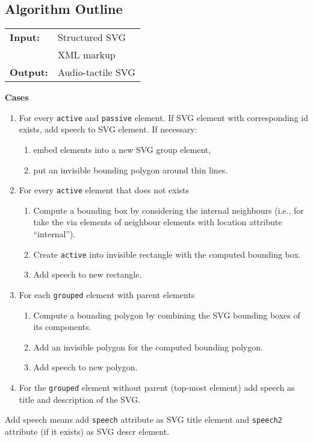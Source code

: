 \documentclass{article}
\def\atom{\texttt{active}\xspace}
\def\passive{\texttt{passive}\xspace}
\def\grouped{\texttt{grouped}\xspace}
\begin{document}
\subsection*{Algorithm Outline}

\begin{tabular}{ll}
  \textbf{Input:} & Structured SVG \\
  & XML markup \\
  \textbf{Output:} & Audio-tactile SVG
\end{tabular}

\textbf{Cases}

\begin{enumerate}
\item For every \atom and \passive element. If SVG element with corresponding id
  exists, add speech to SVG element. If necessary:
  \begin{enumerate}
  \item embed elements into a new SVG group element,
  \item put an invisible bounding polygon around thin lines.
  \end{enumerate}
\item For every \atom element that does not exists
  \begin{enumerate}
  \item Compute a bounding box by considering the internal neighbours (i.e., for
    take the via elements of neighbour elements with location attribute
    ``internal'').
  \item Create \atom into invisible rectangle with the computed bounding box.
  \item Add speech to new rectangle.
  \end{enumerate}
\item For each \grouped element with parent elements
  \begin{enumerate}
  \item Compute a bounding polygon by combining the SVG bounding boxes of its components.
  \item Add an invisible polygon for the computed bounding polygon.
  \item Add speech to new polygon.
  \end{enumerate}
\item For the \grouped element without parent (top-most element) add speech as
  title and description of the SVG.
\end{enumerate}

Add speech means add \texttt{speech} attribute as SVG title element and \texttt{speech2} attribute (if it exists) as SVG descr element.
\end{document}
